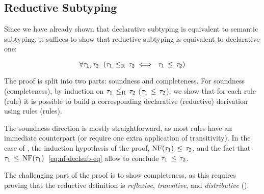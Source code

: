 \subsection{Reductive Subtyping}\label{sec:redsub-correct}

Since we have already shown that declarative subtyping is
equivalent to semantic subtyping, it suffices to show that
reductive subtyping is equivalent to declarative one:

\begin{theorem}\label{thm:redsub-correct}
\[
\forall \ty_1, \ty_2.\ (\bjsubr{\ty_1}{\ty_2} \iff\ \bjsub{\ty_1}{\ty_2})
\]
\end{theorem}

The proof is split into two parts: soundness and completeness.
For soundness (completeness), 
by induction on $\tau_1 \, \leq_\mathrm{R} \, \tau_2$ ($\tau_1 \, \leq \, \tau_2$),
we show that for each \RR{}\!rule (\RD{}\!rule) it is possible to build
a corresponding declarative (reductive) derivation 
using \RD{}\!rules (\RR{}\!rules).

The soundness direction is mostly straightforward, as most \RR{}\!rules
have an immediate \RD{}\!counterpart (or require one extra application
of transitivity).
In the case of , the induction hypothesis of the proof,
$\mathop{\mathrm{NF}}(\tau_1) \, \leq \, \tau_2$, 
and the fact that $\tau_1 \, \leq \, \mathop{\mathrm{NF}}(\tau_1)$~\eqref{eq:nf-declsub-eq}
allow to conclude $\tau_1 \, \leq \, \tau_2$.

The challenging part of the proof is to show completeness,
as this requires proving that the reductive definition 
is \emph{reflexive}, \emph{transitive}, and \emph{distributive}
().


